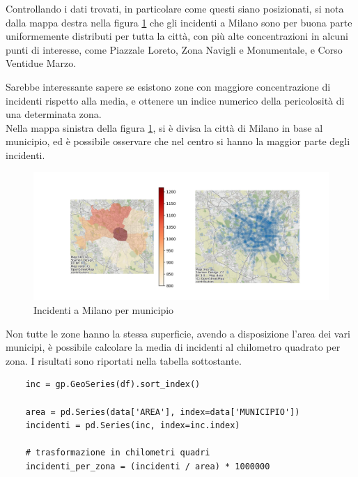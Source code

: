 \documentclass[a4paper]{report}
\begin{document}
Controllando i dati trovati, in particolare come questi siano posizionati, 
si nota dalla mappa destra nella figura \ref{fig:heatmap-municipi} che gli incidenti a Milano 
sono per buona parte uniformemente distributi per tutta la città, 
con più alte concentrazioni in alcuni punti di interesse, come Piazzale Loreto, Zona Navigli 
e Monumentale, e Corso Ventidue Marzo.

Sarebbe interessante sapere se esistono zone con maggiore concentrazione di incidenti rispetto 
alla media, e ottenere un indice numerico della pericolosità di una determinata zona.\\

Nella mappa sinistra della figura \ref{fig:heatmap-municipi}, si è divisa la città di Milano 
in base al municipio, ed è possibile osservare che nel centro si hanno la maggior parte degli 
incidenti.

\begin{figure}
    \includegraphics[width=\linewidth]{../src/municipi_milano/incidenti_municipio.png}
    \caption{Incidenti a Milano per municipio}
    \label{fig:heatmap-municipi}
\end{figure}

Non tutte le zone hanno la stessa superficie, avendo a disposizione l'area dei vari municipi, 
è possibile calcolare la media di incidenti al chilometro quadrato per zona.
I risultati sono riportati nella tabella sottostante.

\begin{lstlisting}    
    inc = gp.GeoSeries(df).sort_index()

    area = pd.Series(data['AREA'], index=data['MUNICIPIO'])
    incidenti = pd.Series(inc, index=inc.index)

    # trasformazione in chilometri quadri
    incidenti_per_zona = (incidenti / area) * 1000000 
\end{lstlisting}
\end{document}

